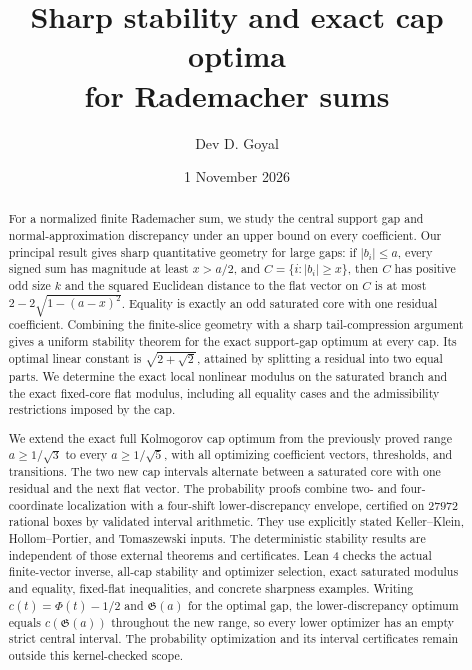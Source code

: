 \documentclass[11pt]{article}
\title{\textbf{Sharp stability and exact cap optima\\for Rademacher sums}}
\author{Dev D. Goyal}
\date{1 November 2026}
\theoremstyle{remark}\newtheorem{remark}[theorem]{Remark}
\begin{document}
\maketitle
\begin{abstract}
For a normalized finite Rademacher sum, we study the central support gap
and normal-approximation discrepancy under an upper bound on every
coefficient. Our principal result gives sharp quantitative geometry for
large gaps: if $|b_i|\le a$, every signed sum has magnitude at least
$x>a/2$, and $C=\{i:|b_i|\ge x\}$, then $C$ has positive odd size $k$
and the squared Euclidean distance to the flat vector on $C$ is at most
$2-2\sqrt{1-(a-x)^2}$. Equality is exactly an odd saturated core with
one residual coefficient. Combining the finite-slice geometry with a
sharp tail-compression argument gives a uniform stability theorem for
the exact support-gap optimum at every cap. Its optimal linear constant
is $\sqrt{2+\sqrt2}$, attained by splitting a residual into two equal
parts. We determine the exact local nonlinear modulus on the saturated
branch and the exact fixed-core flat modulus, including all equality
cases and the admissibility restrictions imposed by the cap.

We extend the exact full Kolmogorov cap optimum from the previously
proved range $a\ge1/\sqrt3$ to every $a\ge1/\sqrt5$, with all
optimizing coefficient vectors, thresholds, and transitions. The two
new cap intervals alternate between a saturated core with one residual
and the next flat vector. The probability proofs combine two- and
four-coordinate localization with a four-shift lower-discrepancy
envelope, certified on $27972$ rational boxes by validated interval
arithmetic. They use explicitly stated Keller--Klein, Hollom--Portier,
and Tomaszewski inputs. The deterministic stability results are
independent of those external theorems and certificates. Lean 4 checks
the actual finite-vector inverse, all-cap stability and optimizer
selection, exact saturated modulus and equality, fixed-flat inequalities,
and concrete sharpness examples. Writing $c(t)=\Phi(t)-1/2$ and
$\mathfrak G(a)$ for the optimal gap, the lower-discrepancy optimum equals
$c(\mathfrak G(a))$ throughout the new range, so every lower optimizer
has an empty strict central interval. The probability optimization and its
interval certificates remain outside this kernel-checked scope.
\end{abstract}
\end{document}
